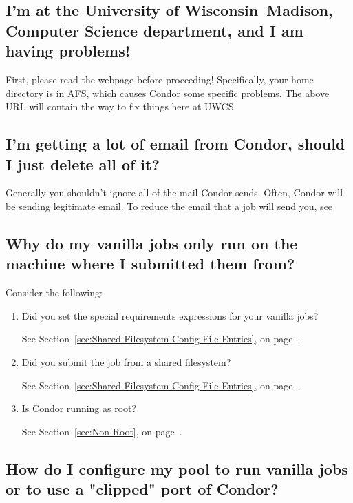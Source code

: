 \subsection{I'm at the University of Wisconsin--Madison, Computer Science department, and I am having problems!}

First, please read the webpage  before proceeding!
Specifically, your home directory is in AFS, which causes Condor some specific problems.
The above URL will contain the way to fix things here at UWCS.

\subsection{I'm getting a lot of email from Condor, should I just delete all of it?}

Generally you shouldn't ignore all of the mail Condor sends.  Often, Condor will
be sending legitimate email.  To reduce the email that a job will send you, see

\Todo


\subsection{Why do my vanilla jobs only run on the machine where I submitted them from?}
Consider the following:
\begin {enumerate}
\item{Did you set the special requirements expressions for
your vanilla jobs?}

See Section~\ref{sec:Shared-Filesystem-Config-File-Entries}, on page~\pageref{sec:Shared-Filesystem-Config-File-Entries}.

\item{Did you submit the job from a shared filesystem?}

See Section~\ref{sec:Shared-Filesystem-Config-File-Entries}, on page~\pageref{sec:Shared-Filesystem-Config-File-Entries}.

\item{Is Condor running as root?}

See Section~\ref{sec:Non-Root}, on page~\pageref{sec:Non-Root}.

\end{enumerate}
\subsection{How do I configure my pool to run vanilla jobs or to use a "clipped" port of Condor?}

